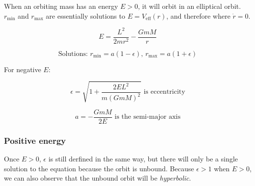 \documentclass[12pt]{article}
\begin{document}
When an orbiting mass has an energy $E > 0$, it will orbit in an elliptical orbit.
$r_{\text{min}}$ and $r_{\text{max}}$ are essentially solutions to $E = V_{\text{eff}}(r)$, and therefore where $\dot{r} = 0$.

\[
E = \frac{L^2}{2mr^2} - \frac{GmM}{r}
\]

\[
\text{Solutions: } r_{\text{min}} = a(1 - \epsilon)\text{, } r_{\text{max}} = a(1 + \epsilon)
\]

For negative $E$:

\[
\epsilon = \sqrt{1 + \frac{2EL^2}{m(GmM)^2}}\text{ is eccentricity}
\]

\[
a = -\frac{GmM}{2E}\text{ is the semi-major axis}
\]

\newpage

\subsubsection{Positive energy}

Once $E>0$, $\epsilon$ is still derfined in the same way, but there will only be a single solution to the equation because the orbit is unbound.
Because $\epsilon > 1$ when $E>0$, we can also observe that the unbound orbit will be \emph{hyperbolic}.
\end{document}
